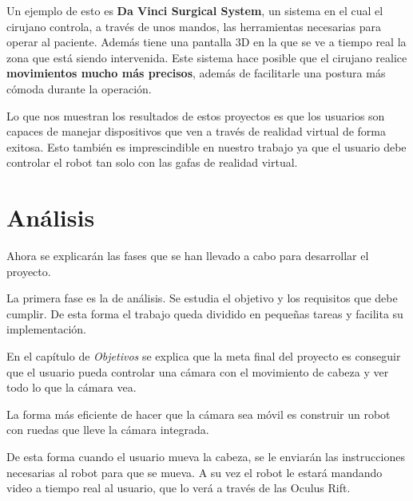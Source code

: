\documentclass[twoside, 11pt]{epstfg}
\begin{document}
Un ejemplo de esto es \textbf{Da Vinci Surgical System}, un sistema en el cual el cirujano controla, a través de unos mandos, las herramientas necesarias para operar al paciente. Además tiene una pantalla 3D en la que se ve a tiempo real la zona que está siendo intervenida.
Este sistema hace posible que el cirujano realice \textbf{movimientos mucho más precisos}, además de facilitarle una postura más cómoda durante la operación. \cite{Hubens2003}

Lo que nos muestran los resultados de estos proyectos es que los usuarios son capaces de manejar dispositivos que ven a través de realidad virtual de forma exitosa. Esto también es imprescindible en nuestro trabajo ya que el usuario debe controlar el robot tan solo con las gafas de realidad virtual. 




\chapter{Análisis}
\label{chap:sistemadesarrollado}
Ahora se explicarán las fases que se han llevado a cabo para desarrollar el proyecto.

La primera fase es la de análisis. Se estudia el objetivo y los requisitos que debe cumplir. De esta forma el trabajo queda dividido en pequeñas tareas y facilita su implementación.

En el capítulo de \textit{Objetivos} se explica que la meta final del proyecto es conseguir que el usuario pueda controlar una cámara con el movimiento de cabeza y ver todo lo que la cámara vea.

La forma más eficiente de hacer que la cámara sea móvil es construir un robot con ruedas que lleve la cámara integrada. 

De esta forma cuando el usuario mueva la cabeza, se le enviarán las instrucciones necesarias al robot para que se mueva. A su vez el robot le estará mandando video a tiempo real al usuario, que lo verá a través de las Oculus Rift.
\end{document}
